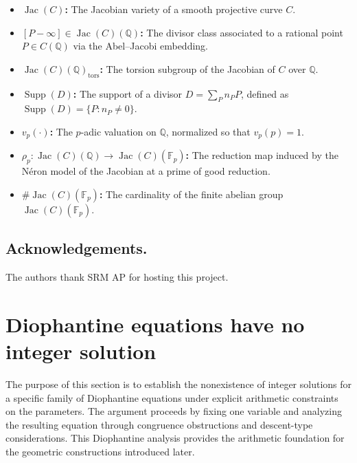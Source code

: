 \documentclass[12pt, reqno]{amsart}
\DeclareMathOperator{\Supp}{Supp}
\numberwithin{equation}{section}
\theoremstyle{definition}
\theoremstyle{nodefstyle}
\newcommand{\Jac}{\operatorname{Jac}}
\begin{document}
\begin{itemize}
  \item \textbf{$\Jac(C)$:}
  The Jacobian variety of a smooth projective curve $C$.

  \item \textbf{$[P-\infty] \in \Jac(C)(\mathbb{Q})$:}
  The divisor class associated to a rational point $P \in C(\mathbb{Q})$ via the
  Abel--Jacobi embedding.

  \item \textbf{$\Jac(C)(\mathbb{Q})_{\mathrm{tors}}$:}
  The torsion subgroup of the Jacobian of $C$ over $\mathbb{Q}$.


  \item \textbf{$\Supp(D)$:}
  The support of a divisor $D = \sum_P n_P P$, defined as
  $\Supp(D) = \{ P : n_P \neq 0 \}$.

  \item \textbf{$v_p(\cdot)$:}
  The $p$-adic valuation on $\mathbb{Q}$, normalized so that $v_p(p)=1$.


  \item \textbf{$\rho_p : \Jac(C)(\mathbb{Q}) \to \Jac(C)(\mathbb{F}_p)$:}
  The reduction map induced by the N\'eron model of the Jacobian at a prime of good
  reduction.

  \item \textbf{$\#\Jac(C)(\mathbb{F}_p)$:}
  The cardinality of the finite abelian group $\Jac(C)(\mathbb{F}_p)$.
\end{itemize}

\subsection{Acknowledgements.} The authors thank SRM AP for hosting this project.



\section{Diophantine equations have no integer solution}\label{sec:diophantine}
The purpose of this section is to establish the nonexistence of integer solutions for a
specific family of Diophantine equations under explicit arithmetic constraints on the
parameters. The argument proceeds by fixing one variable and analyzing the resulting
equation through congruence obstructions and descent-type considerations. This
Diophantine analysis provides the arithmetic foundation for the geometric constructions
introduced later.
\end{document}
